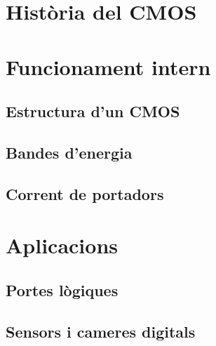 \documentclass[11pt,a4paper]{article}
\begin{document}
\section{Història del CMOS}

\section{Funcionament intern}

\subsection{Estructura d'un CMOS}

\subsection{Bandes d'energia}

\subsection{Corrent de portadors}


\section{Aplicacions}

\subsection{Portes lògiques}

\subsection{Sensors i cameres digitals}

\printbibliography
\end{document}
